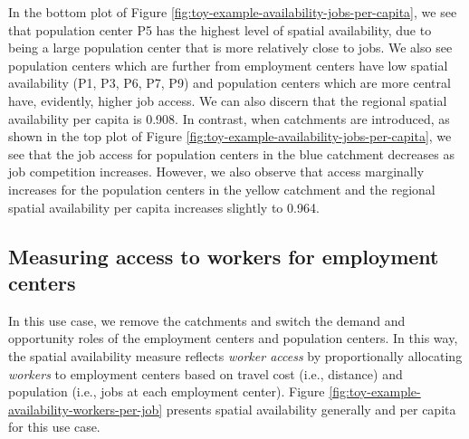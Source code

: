 \documentclass[]{elsarticle} %
\begin{document}
In the bottom plot of Figure
\ref{fig:toy-example-availability-jobs-per-capita}, we see that
population center P5 has the highest level of spatial availability, due
to being a large population center that is more relatively close to
jobs. We also see population centers which are further from employment
centers have low spatial availability (P1, P3, P6, P7, P9) and
population centers which are more central have, evidently, higher job
access. We can also discern that the regional spatial availability per
capita is 0.908. In contrast, when catchments are introduced, as shown
in the top plot of Figure
\ref{fig:toy-example-availability-jobs-per-capita}, we see that the job
access for population centers in the blue catchment decreases as job
competition increases. However, we also observe that access marginally
increases for the population centers in the yellow catchment and the
regional spatial availability per capita increases slightly to 0.964.

\hypertarget{measuring-access-to-workers-for-employment-centers}{%
\subsection{Measuring access to workers for employment
centers}\label{measuring-access-to-workers-for-employment-centers}}

In this use case, we remove the catchments and switch the demand and
opportunity roles of the employment centers and population centers. In
this way, the spatial availability measure reflects \emph{worker access}
by proportionally allocating \emph{workers} to employment centers based
on travel cost (i.e., distance) and population (i.e., jobs at each
employment center). Figure
\ref{fig:toy-example-availability-workers-per-job} presents spatial
availability generally and per capita for this use case.
\end{document}
